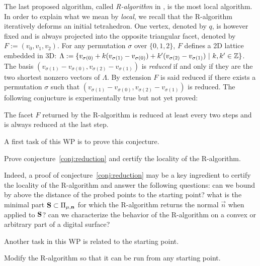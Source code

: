 The last proposed algorithm, called \emph{R-algorithm} in \cite{LPRJMIV2017}, is the most
local algorithm. In order to explain what we mean by \emph{local}, we recall that
the R-algorithm iteratively deforms an initial tetrahedron. One vertex, denoted by $q$,
is however fixed and is always projected into the opposite triangular facet, denoted by
$F := (v_0,v_1,v_2)$. For any permutation $\sigma$ over $\{0,1,2\}$, $F$ defines a 2D
lattice embedded in 3D:
$\Lambda := \{ v_{\sigma(0)} + k (v_{\sigma(1)}-v_{\sigma(0)}) + k' (v_{\sigma(2)}-v_{\sigma(1)}) \ | \ k,k' \in {\ensuremath\mathbb{Z}} \}$. 
The basis $(v_{\sigma(1)}-v_{\sigma(0)}, v_{\sigma(2)}-v_{\sigma(1)})$ is \emph{reduced} if and only
if they are the two shortest nonzero vectors of $\Lambda$. By extension $F$ is said reduced
if there exists a permutation $\sigma$ such that $(v_{\sigma(1)}-v_{\sigma(0)}, v_{\sigma(2)}-v_{\sigma(1)})$
is reduced. The following conjucture is experimentally true but not yet proved:

\begin{Conjecture}
  \label{conj:reduction}
  The facet $F$ returned by the R-algorithm is reduced at least every two steps and
  is always reduced at the last step.  
\end{Conjecture}

A first task of this WP is to prove this conjecture.

\begin{Task}
  \label{task:reduction}
  Prove conjecture~\ref{conj:reduction} and certify the locality of the R-algorithm. 
\end{Task}

Indeed, a proof of conjecture~\ref{conj:reduction} may be a key ingredient
to certify the locality of the R-algorithm and answer
the following questions: can we bound by above the distance of the probed
points to the starting point? 
what is the minimal part $\mathbf{S} \subset \Pi_{\mu,\mathbf{n}}$ for which the
R-algorithm returns the normal $\vec{n}$ when applied to $\mathbf{S}$?
can we characterize the behavior of the R-algorithm on a convex or arbitrary
part of a digital surface?

Another task in this WP is related to the starting point.

\begin{Task}
  \label{task:start}
  Modify the R-algorithm so that it can be run from any starting point. 
\end{Task}

